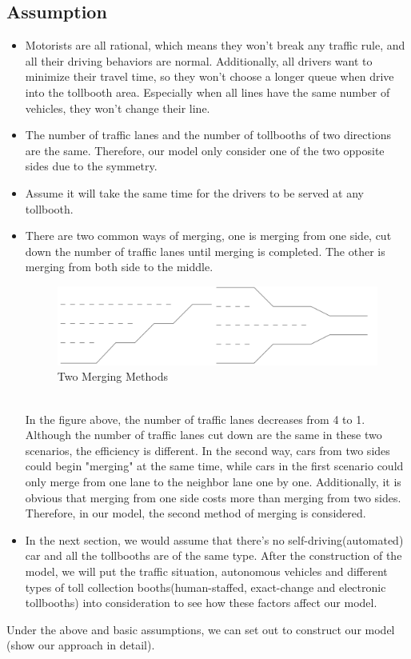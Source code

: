 \subsection{Assumption}
\begin{itemize}
\item
Motorists are all rational, which means they won't break any traffic rule, and all their driving behaviors are normal. Additionally, all drivers want to minimize their travel time, so they won't choose a longer queue when drive into the tollbooth area. Especially when all lines have the same number of vehicles, they won't change their line.
\item
The number of traffic lanes and the number of tollbooths of two directions are the same. Therefore, our model only consider one of the two opposite sides due to the symmetry.
\item
Assume it will take the same time for the drivers to be served at any tollbooth.
\item
There are two common ways of merging, one is merging from one side, cut down the number of traffic lanes until merging is completed. The other is merging from both side to the middle.
\\
\begin{figure}[h]
\small
\centering
\includegraphics[width=12cm]{Two_Merging_Method.png}
\caption{Two Merging Methods} \label{fig:Two Merging Methods}
\end{figure}
\\
In the figure above, the number of traffic lanes decreases from 4 to 1. Although the number of traffic lanes cut down are the same in these two scenarios, the efficiency is different. In the second way, cars from two sides could begin "merging" at the same time, while cars in the first scenario could only merge from one lane to the neighbor lane one by one. Additionally, it is obvious that merging from one side costs more than merging from two sides. Therefore, in our model, the second method of merging is considered. 
\item
In the next section, we would assume that there's no self-driving(automated) car and all the tollbooths are of the same type. After the construction of the model, we will put the traffic situation, autonomous vehicles and different types of toll collection booths(human-staffed, exact-change and electronic tollbooths) into consideration to see how these factors affect our model.
\end{itemize}
\noindent
Under the above and basic assumptions, we can set out to construct our model (show our approach in detail).

